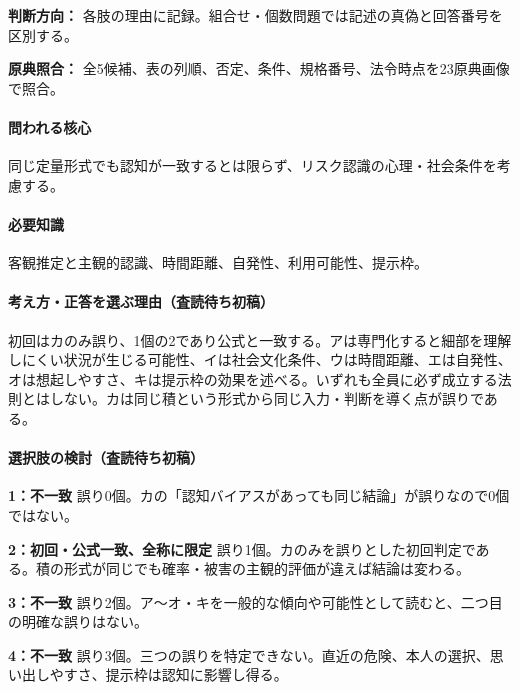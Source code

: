 \noindent\textbf{判断方向：} 各肢の理由に記録。組合せ・個数問題では記述の真偽と回答番号を区別する。\par

\noindent\textbf{原典照合：} 全5候補、表の列順、否定、条件、規格番号、法令時点を23原典画像で照合。\par

\paragraph{問われる核心} 同じ定量形式でも認知が一致するとは限らず、リスク認識の心理・社会条件を考慮する。

\paragraph{必要知識} 客観推定と主観的認識、時間距離、自発性、利用可能性、提示枠。

\paragraph{考え方・正答を選ぶ理由（査読待ち初稿）} 初回はカのみ誤り、1個の2であり公式と一致する。アは専門化すると細部を理解しにくい状況が生じる可能性、イは社会文化条件、ウは時間距離、エは自発性、オは想起しやすさ、キは提示枠の効果を述べる。いずれも全員に必ず成立する法則とはしない。カは同じ積という形式から同じ入力・判断を導く点が誤りである。

\paragraph{選択肢の検討（査読待ち初稿）}\mbox{}\par

\noindent\textbf{1：不一致} 誤り0個。カの「認知バイアスがあっても同じ結論」が誤りなので0個ではない。\par

\noindent\textbf{2：初回・公式一致、全称に限定} 誤り1個。カのみを誤りとした初回判定である。積の形式が同じでも確率・被害の主観的評価が違えば結論は変わる。\par

\noindent\textbf{3：不一致} 誤り2個。ア〜オ・キを一般的な傾向や可能性として読むと、二つ目の明確な誤りはない。\par

\noindent\textbf{4：不一致} 誤り3個。三つの誤りを特定できない。直近の危険、本人の選択、思い出しやすさ、提示枠は認知に影響し得る。\par

